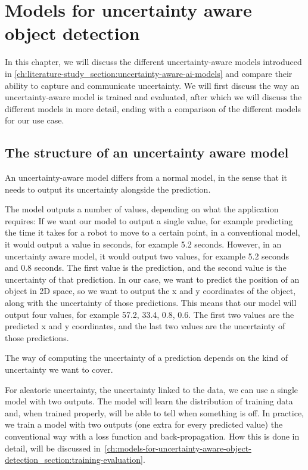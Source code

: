
\chapter{Models for uncertainty aware object detection}\label{ch:models-for-uncertainty-aware-object-detection}
In this chapter, we will discuss the different uncertainty-aware models introduced in \cref{ch:literature-study_section:uncertainty-aware-ai-models} and compare their ability to capture and communicate uncertainty.
We will first discuss the way an uncertainty-aware model is trained and evaluated, after which we will discuss the different models in more detail, ending with a comparison of the different models for our use case.

\section{The structure of an uncertainty aware model}\label{ch:models-for-uncertainty-aware-object-detection_section:the-structure-of-an-uncertainty-aware-model}
An uncertainty-aware model differs from a normal model, in the sense that it needs to output its uncertainty alongside the prediction.

The model outputs a number of values, depending on what the application requires:
If we want our model to output a single value, for example predicting the time it takes for a robot to move to a certain point, in a conventional model, it would output a value in seconds, for example 5.2 seconds.
However, in an uncertainty aware model, it would output two values, for example 5.2 seconds and 0.8 seconds.
The first value is the prediction, and the second value is the uncertainty of that prediction.
In our case, we want to predict the position of an object in 2D space, so we want to output the x and y coordinates of the object, along with the uncertainty of those predictions.
This means that our model will output four values, for example 57.2, 33.4, 0.8, 0.6.
The first two values are the predicted x and y coordinates, and the last two values are the uncertainty of those predictions.

The way of computing the uncertainty of a prediction depends on the kind of uncertainty we want to cover.

For aleatoric uncertainty, the uncertainty linked to the data, we can use a single model with two outputs.
The model will learn the distribution of training data and, when trained properly, will be able to tell when something is off.
In practice, we train a model with two outputs (one extra for every predicted value) the conventional way with a loss function and back-propagation.
How this is done in detail, will be discussed in~\cref{ch:models-for-uncertainty-aware-object-detection_section:training-evaluation}.

